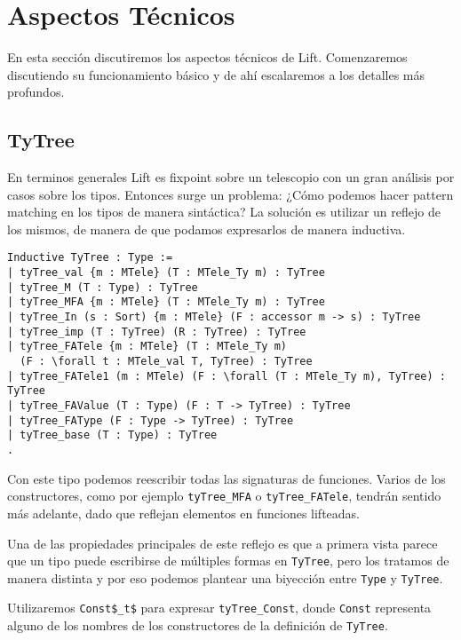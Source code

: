 \section{Aspectos Técnicos}

En esta sección discutiremos los aspectos técnicos de Lift. Comenzaremos discutiendo su funcionamiento básico y de ahí
escalaremos a los detalles más profundos. 

\subsection{TyTree}

En terminos generales Lift es fixpoint sobre un telescopio con un gran análisis por casos sobre los tipos.
Entonces surge un problema: ¿Cómo podemos hacer pattern matching en los tipos de manera sintáctica?
La solución es utilizar un reflejo de los mismos, de manera de que podamos expresarlos de manera inductiva.

\begin{lstlisting}
Inductive TyTree : Type :=
| tyTree_val {m : MTele} (T : MTele_Ty m) : TyTree
| tyTree_M (T : Type) : TyTree
| tyTree_MFA {m : MTele} (T : MTele_Ty m) : TyTree
| tyTree_In (s : Sort) {m : MTele} (F : accessor m -> s) : TyTree
| tyTree_imp (T : TyTree) (R : TyTree) : TyTree
| tyTree_FATele {m : MTele} (T : MTele_Ty m)
  (F : \forall t : MTele_val T, TyTree) : TyTree
| tyTree_FATele1 (m : MTele) (F : \forall (T : MTele_Ty m), TyTree) : TyTree
| tyTree_FAValue (T : Type) (F : T -> TyTree) : TyTree
| tyTree_FAType (F : Type -> TyTree) : TyTree
| tyTree_base (T : Type) : TyTree
.
\end{lstlisting}

Con este tipo podemos reescribir todas las signaturas de funciones. Varios de los constructores, como por ejemplo
\lstinline{tyTree_MFA} o \lstinline{tyTree_FATele}, tendrán sentido más adelante, dado que reflejan elementos en
funciones lifteadas.

Una de las propiedades principales de este reflejo es que a primera vista parece que un tipo puede escribirse de múltiples formas en \lstinline{TyTree}, pero los tratamos de manera distinta y por eso podemos plantear una biyección
entre \lstinline{Type} y \lstinline{TyTree}.

Utilizaremos \lstinline{Const$_t$} para expresar \lstinline{tyTree_Const}, donde \lstinline{Const} representa alguno de los nombres de los constructores de la definición de \lstinline{TyTree}. 

